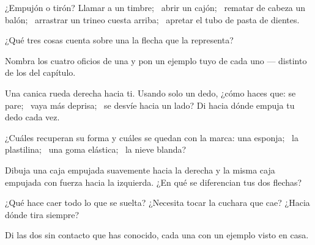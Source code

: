 \begin{exercise}[$\star$]\label{exo:g2:pushes-and-pulls:1}
¿Empujón o tirón? Llamar a un timbre; \ abrir un cajón; \ rematar de
cabeza un balón; \ arrastrar un trineo cuesta arriba; \ apretar el
tubo de pasta de dientes.
\end{exercise}

\begin{exercise}[$\star$]\label{exo:g2:pushes-and-pulls:2}
¿Qué tres cosas cuenta sobre una  la flecha que la representa?
\end{exercise}

\begin{exercise}[$\star$]\label{exo:g2:pushes-and-pulls:3}
Nombra los cuatro oficios de una  y pon un ejemplo tuyo de cada
uno --- distinto de los del capítulo.
\end{exercise}

\begin{exercise}[$\star$]\label{exo:g2:pushes-and-pulls:4}
Una canica rueda derecha hacia ti. Usando solo un dedo, ¿cómo haces
que: se pare; \ vaya más deprisa; \ se desvíe hacia un lado? Di hacia
dónde empuja tu dedo cada vez.
\end{exercise}

\begin{exercise}[$\star$]\label{exo:g2:pushes-and-pulls:5}
¿Cuáles recuperan su forma y cuáles se quedan con la marca: una
esponja; \ la plastilina; \ una goma elástica; \ la nieve blanda?
\end{exercise}

\begin{exercise}[$\star$]\label{exo:g2:pushes-and-pulls:6}
Dibuja una caja empujada suavemente hacia la derecha y la misma caja
empujada con fuerza hacia la izquierda. ¿En qué se diferencian tus dos
flechas?
\end{exercise}

\begin{exercise}[$\star$]\label{exo:g2:pushes-and-pulls:7}
¿Qué  hace caer todo lo que se suelta? ¿Necesita tocar la
cuchara que cae? ¿Hacia dónde tira siempre?
\end{exercise}

\begin{exercise}[$\star$]\label{exo:g2:pushes-and-pulls:8}
Di las dos  sin contacto que has conocido, cada una con un
ejemplo visto en casa.
\end{exercise}

